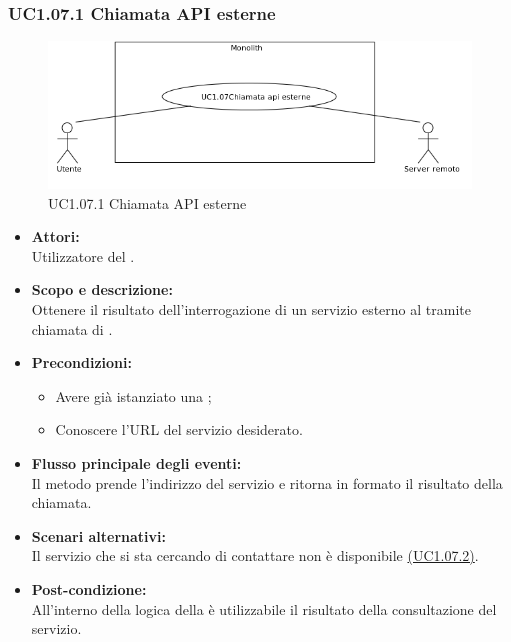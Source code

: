 \subsubsection{UC1.07.1 Chiamata API esterne} \label{UC1.07.1}

\begin{figure}[H]
	\centering
	\includegraphics[width=15cm]{../../documenti/AnalisiDeiRequisiti/Diagrammi_img/uc1_07.png}
	\caption{UC1.07.1 Chiamata API esterne}
\end{figure}

\begin{itemize}
	\item \textbf{Attori:}
	\\Utilizzatore del .
	\item \textbf{Scopo e descrizione:} 
	\\Ottenere il risultato dell'interrogazione di un servizio esterno al  tramite chiamata di .
	\item \textbf{Precondizioni:}
	\begin{itemize}
		\item Avere già istanziato una ;
		\item Conoscere l'URL del servizio desiderato.
	\end{itemize}
	\item \textbf{Flusso principale degli eventi:}
	\\Il metodo prende l'indirizzo del servizio e ritorna in formato  il risultato della chiamata.
	\item \textbf{Scenari alternativi:}
	\\Il servizio che si sta cercando di contattare non è disponibile \hyperref[UC1.07.2]{(UC1.07.2)}.
	\item \textbf{Post-condizione:}
	\\All'interno della logica della  è utilizzabile il risultato della consultazione del servizio.
\end{itemize}

